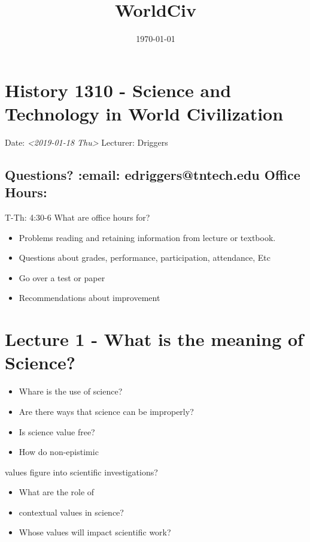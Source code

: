 \documentclass[11pt]{article}
\date{\today}
\title{WorldCiv}
\begin{document}
\maketitle
\tableofcontents

\section{History 1310 - Science and Technology in World Civilization}
\label{sec-1}

Date: \textit{<2019-01-18 Thu>} Lecturer: Driggers

\subsection{Questions? :email: edriggers@tntech.edu \textbf{Office Hours}:}
\label{sec-1-1}
T-Th: 4:30-6
What are office hours for? 
\begin{itemize}
\item Problems reading and retaining information from lecture or textbook.

\item Questions about grades, performance, participation, attendance, Etc

\item Go over a test or paper

\item Recommendations about improvement
\end{itemize}

\section{Lecture 1 - What is the meaning of Science?}
\label{sec-2}

\begin{itemize}
\item Whare is the use of science?

\item Are there ways that science can be improperly?

\item Is science value free?

\item How do non-epistimic
\end{itemize}

values figure into scientific investigations? 

\begin{itemize}
\item What are the role of

\item contextual values in science?

\item Whose values will impact scientific work?
\end{itemize}
\end{document}
